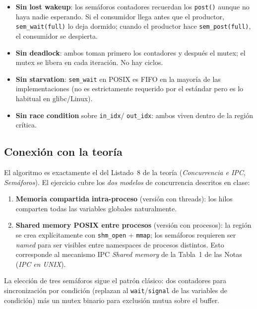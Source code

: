 \documentclass[11pt,a4paper]{article}
\begin{document}
\begin{itemize}[leftmargin=*,nosep]
    \item \textbf{Sin lost wakeup}: los semáforos contadores recuerdan
        los \texttt{post()} aunque no haya nadie esperando. Si el
        consumidor llega antes que el productor,
        \texttt{sem\_wait(full)} lo deja dormido; cuando el productor
        hace \texttt{sem\_post(full)}, el consumidor se despierta.
    \item \textbf{Sin deadlock}: ambos toman primero los contadores y
        después el mutex; el mutex se libera en cada iteración. No hay
        ciclos.
    \item \textbf{Sin starvation}: \texttt{sem\_wait} en POSIX es FIFO
        en la mayoría de las implementaciones (no es estrictamente
        requerido por el estándar pero es lo habitual en glibc/Linux).
    \item \textbf{Sin race condition} sobre \texttt{in\_idx}/
        \texttt{out\_idx}: ambos viven dentro de la región crítica.
\end{itemize}

\subsection*{Conexión con la teoría}

El algoritmo es exactamente el del Listado~8 de la teoría
(\emph{Concurrencia e IPC}, \emph{Semáforos}). El ejercicio cubre los
\emph{dos modelos} de concurrencia descritos en clase:

\begin{enumerate}[leftmargin=*,nosep]
    \item \textbf{Memoria compartida intra-proceso} (versión con
        threads): los hilos comparten todas las variables globales
        naturalmente.
    \item \textbf{Shared memory POSIX entre procesos} (versión con
        procesos): la región se crea explícitamente con
        \texttt{shm\_open} + \texttt{mmap}; los semáforos requieren ser
        \emph{named} para ser visibles entre namespaces de procesos
        distintos. Esto corresponde al mecanismo IPC \emph{Shared
        memory} de la Tabla~1 de las Notas (\emph{IPC en UNIX}).
\end{enumerate}

La elección de tres semáforos sigue el patrón clásico: dos contadores
para sincronización por condición (replazan al \texttt{wait}/\texttt{signal}
de las variables de condición) más un mutex binario para exclusión
mutua sobre el buffer.
\end{document}
